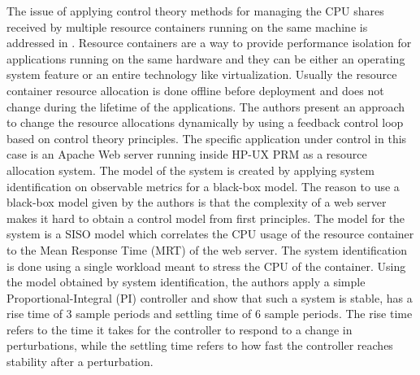 The issue of applying control theory methods for managing the CPU shares received by multiple resource containers running on the same machine is addressed in \cite{related:control3}. Resource containers are a way to provide performance isolation for applications running on the same hardware and they can be either an operating system feature or an entire technology like virtualization. Usually the resource container resource allocation is done offline before deployment and does not change during the lifetime of the applications. The authors present an approach to change the resource allocations dynamically by using a feedback control loop based on control theory principles. The specific application under control in this case is an Apache Web server running inside HP-UX PRM as a resource allocation system. The model of the system is created by applying system identification on observable metrics for a black-box model. The reason to use a black-box model given by the authors is that the complexity of a web server makes it hard to obtain a control model from first principles. The model for the system is a SISO model which correlates the CPU usage of the resource container to the Mean Response Time (MRT) of the web server. The system identification is done using a single workload meant to stress the CPU of the container. Using the model obtained by system identification, the authors apply a simple Proportional-Integral (PI) controller and show that such a system is stable, has a rise time of 3 sample periods and settling time of 6 sample periods. The rise time refers to the time it takes for the controller to respond to a change in perturbations, while the settling time refers to how fast the controller reaches stability after a perturbation.

